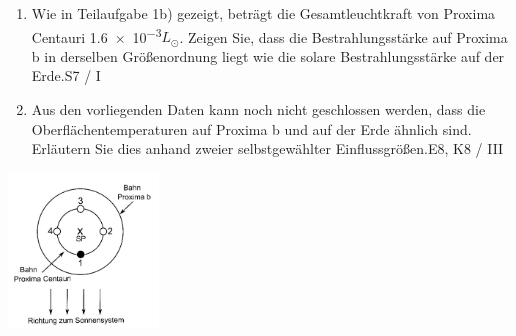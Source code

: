 \begin{aufgabe}
\begin{enumerate}[resume]
		\item Wie in Teilaufgabe 1b) gezeigt, beträgt die Gesamtleuchtkraft von Proxima Centauri \num{1.6e-3}$L_\odot$. Zeigen Sie, dass die Bestrahlungsstärke auf Proxima b in derselben Größenordnung liegt wie die solare Bestrahlungsstärke auf der Erde.\newline \hfill S7 / I
		\item Aus den vorliegenden Daten kann noch nicht geschlossen werden, dass die Oberflächentemperaturen auf Proxima b und auf der Erde ähnlich sind. Erläutern Sie dies anhand zweier selbstgewählter Einflussgrößen.\newline \hfill E8, K8 / III
	\end{enumerate}
	\tcblower
		\centering
		\includegraphics[width=0.3\textwidth]{Bilder/Proxima_schwerpunkt.jpg}{}
		\label{fig:Proxima-Schwerpunkt}
\end{aufgabe}

